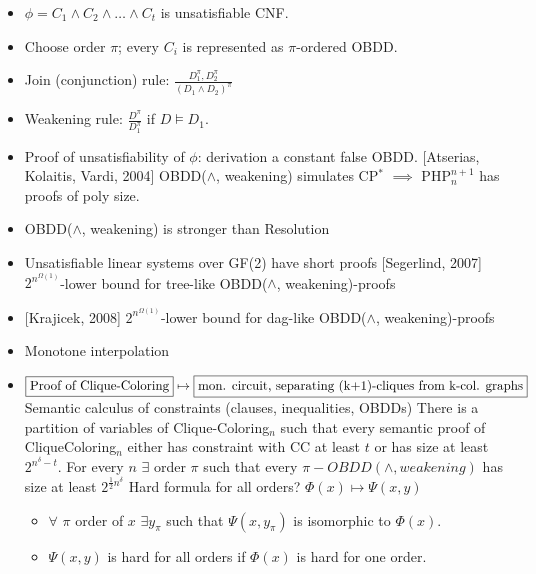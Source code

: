 
{
\begin{itemize}
\item $\phi = C_1\land C_2\land\dots \land C_t$ is unsatisfiable CNF.
\item Choose order $\pi$; every $C_i$ is represented as $\pi$-ordered OBDD.
\item Join (conjunction) rule: $\frac{D_1^{\pi}, D_2^{\pi}} {(D_1\land D_2)^{\pi}}$
\item Weakening rule: $\frac{D^{\pi}}{D_1^{\pi}}$ if $D\models D_1$.
\item Proof of unsatisfiability of $\phi$: derivation a constant false OBDD.
\pitem{} [Atserias, Kolaitis, Vardi, 2004] OBDD($\land$, weakening) simulates CP$^*$ \pause $\implies$ PHP$^{n+1}_n$ has proofs of poly size.
\item OBDD($\land$, weakening) is stronger than Resolution
\item Unsatisfiable linear systems over GF(2) have short proofs
\pitem{} [Segerlind, 2007] $2^{n^{\Omega(1)}}$-lower bound for tree-like OBDD($\land$, weakening)-proofs
\item{} [Krajicek, 2008] $2^{n^{\Omega(1)}}$-lower bound for dag-like OBDD($\land$, weakening)-proofs
\end{itemize}
}

{
\begin{itemize}
\item Monotone interpolation 
\item $\fbox{Proof of Clique-Coloring} \mapsto \fbox{mon. circuit, separating (k+1)-cliques from k-col. graphs}$  
   \pitem Semantic calculus of constraints (clauses, inequalities, OBDDs)
   \pitem \myth [Krajicek, 1998] There is a partition of variables of Clique-Coloring$_n$ such that every semantic proof of CliqueColoring$_n$ either has constraint with CC at least $t$
or has size at least $2^{n^{\delta}-t}$.
\pitem \mycor For every $n$ $\exists$ order $\pi$ such that every $\pi-OBDD(\land, weakening)$ has size at least $2^{\frac12 n^\delta}$ 
\pitem Hard formula for all orders?
\pitem $\Phi(x)\mapsto \Psi(x,y)$
\begin{itemize}
\item $\forall$ $\pi$ order of $x$ $\exists y_{\pi}$ such that $\Psi(x,y_{\pi})$ is isomorphic to $\Phi(x)$.
\item $\Psi(x,y)$ is hard for all orders if $\Phi(x)$ is hard for one order.
\end{itemize}
\end{itemize}
}

